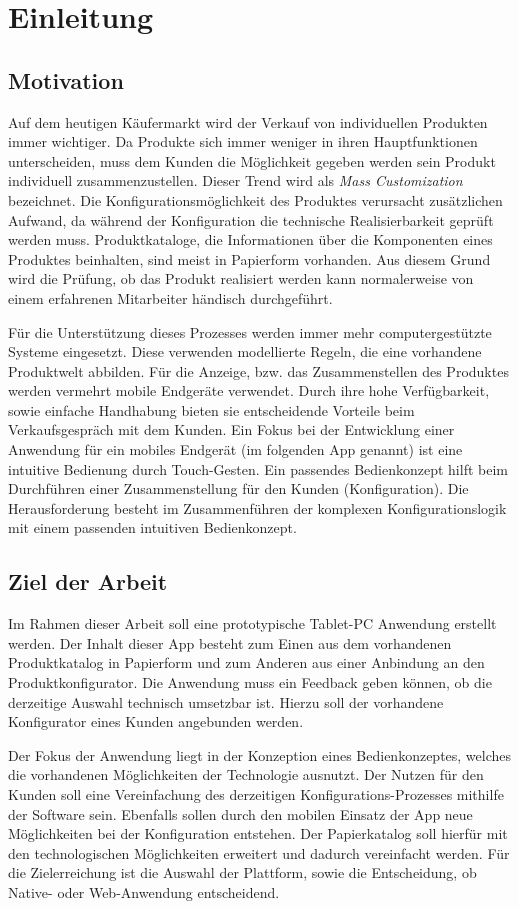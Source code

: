 \chapter{Einleitung}
\section{Motivation} \label{aufgaben}
Auf dem heutigen Käufermarkt wird der Verkauf von individuellen Produkten immer wichtiger. Da Produkte sich immer weniger in ihren Hauptfunktionen unterscheiden, muss dem Kunden die Möglichkeit gegeben werden sein Produkt individuell zusammenzustellen. Dieser Trend wird als \textit{Mass Customization} \cite{bib:massCustomization} bezeichnet. Die Konfigurationsmöglichkeit des Produktes verursacht zusätzlichen Aufwand, da während der Konfiguration die technische Realisierbarkeit geprüft werden muss. Produktkataloge, die Informationen über die Komponenten eines Produktes beinhalten, sind meist in Papierform vorhanden. Aus diesem Grund wird die Prüfung, ob das Produkt realisiert werden kann normalerweise von einem erfahrenen Mitarbeiter händisch durchgeführt.

\par Für die Unterstützung dieses Prozesses werden immer mehr computergestützte Systeme eingesetzt. Diese verwenden modellierte Regeln, die eine vorhandene Produktwelt abbilden. Für die Anzeige, bzw. das Zusammenstellen des Produktes werden vermehrt mobile Endgeräte verwendet. Durch ihre hohe Verfügbarkeit, sowie einfache Handhabung bieten sie entscheidende Vorteile beim Verkaufsgespräch mit dem Kunden. Ein Fokus bei der Entwicklung einer Anwendung für ein mobiles Endgerät (im folgenden App genannt) ist eine intuitive Bedienung durch Touch-Gesten.  Ein passendes Bedienkonzept hilft beim Durchführen einer Zusammenstellung für den Kunden (Konfiguration). Die Herausforderung besteht im Zusammenführen der komplexen Konfigurationslogik mit einem passenden intuitiven Bedienkonzept. 


\section{Ziel der Arbeit} \label{goal}
Im Rahmen dieser Arbeit soll eine prototypische Tablet-PC Anwendung erstellt werden. Der Inhalt dieser App besteht zum Einen aus dem vorhandenen Produktkatalog in Papierform und zum Anderen aus einer Anbindung an den Produktkonfigurator.  Die Anwendung muss ein Feedback geben können, ob die derzeitige Auswahl technisch umsetzbar ist. Hierzu soll der vorhandene Konfigurator eines Kunden angebunden werden.
\par
Der Fokus der Anwendung liegt in der Konzeption eines Bedienkonzeptes, welches die vorhandenen Möglichkeiten der Technologie ausnutzt. Der Nutzen für den Kunden soll eine Vereinfachung des derzeitigen Konfigurations-Prozesses mithilfe der Software sein. Ebenfalls sollen durch den mobilen Einsatz der App neue Möglichkeiten bei der Konfiguration entstehen. Der Papierkatalog soll hierfür mit den technologischen Möglichkeiten erweitert und dadurch vereinfacht werden. Für die Zielerreichung ist die  Auswahl der Plattform, sowie die Entscheidung, ob Native- oder Web-Anwendung entscheidend. 


